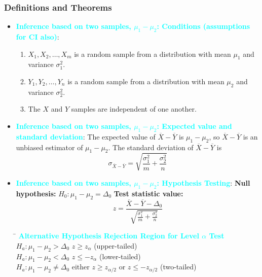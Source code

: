 \documentclass{report}
\begin{document}
    \subsubsection{Definitions and Theorems}
    \begin{itemize}
        
    \item \textbf{\textcolor{cyan}{Inference based on two samples, $\mu_{1} - \mu_{2}$: Conditions (assumptions for CI also)}}:
    \begin{enumerate}
        \item $X_1, X_2, \ldots, X_m$ is a random sample from a distribution with mean $\mu_1$ and variance $\sigma_1^2$.
        \item $Y_1, Y_2, \ldots, Y_n$ is a random sample from a distribution with mean $\mu_2$ and variance $\sigma_2^2$.
        \item The $X$ and $Y$ samples are independent of one another.
    \end{enumerate}
    \item \textbf{\textcolor{cyan}{Inference based on two samples, $\mu_{1} - \mu_{2}$: Expected value and standard deviation}}:
        The expected value of $\overline{X} - \overline{Y}$ is $\mu_1 - \mu_2$, so $\overline{X} - \overline{Y}$ is an unbiased estimator of $\mu_1 - \mu_2$. The standard deviation of $\overline{X} - \overline{Y}$ is
        \[
            \sigma_{\overline{X} - \overline{Y}} = \sqrt{\frac{\sigma_1^2}{m} + \frac{\sigma_2^2}{n}}
        \]
    \item \textbf{\textcolor{cyan}{Inference based on two samples, $\mu_{1}- \mu_{2}$: Hypothesis Testing}}:
        \textbf{Null hypothesis:} $H_0: \mu_1 - \mu_2 = \Delta_0$
        \bigbreak \noindent 
        \textbf{Test statistic value:}
        \[
            z = \frac{\overline{X} - \overline{Y} - \Delta_0}{\sqrt{\frac{\sigma_1^2}{m} + \frac{\sigma_2^2}{n}}}
        \]
        \begin{tabbing}
            \hspace{3cm} \= \kill
            \textcolor{cyan}{\textbf{Alternative Hypothesis}} \> \textcolor{cyan}{\textbf{Rejection Region for Level $\alpha$ Test}} \\
            $H_a: \mu_1 - \mu_2 > \Delta_0$ \> $z \ge z_\alpha$ (upper-tailed) \\
            $H_a: \mu_1 - \mu_2 < \Delta_0$ \> $z \le -z_\alpha$ (lower-tailed) \\
            $H_a: \mu_1 - \mu_2 \neq \Delta_0$ \> either $z \ge z_{\alpha/2}$ or $z \le -z_{\alpha/2}$ (two-tailed) \\

\end{tabbing}
\end{itemize}
\end{document}

